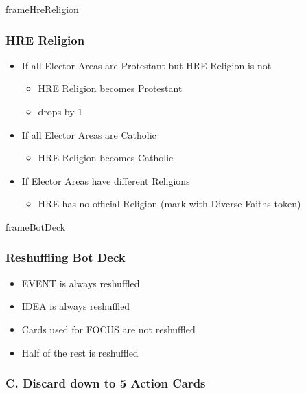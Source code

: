 \documentclass[10pt]{article}
\newlength{\fhHreReligion} \setlength\fhHreReligion{10\baselineskip}
\newlength{\fhBotDeck} \setlength\fhBotDeck{5\baselineskip}
\begin{document}
\begin{dynamiccontents*}{frameHreReligion}\begin{eubox}{\fhHreReligion}
	\subsubsection*{HRE Religion }
	\begin{itemize}
		\item If all Elector Areas are Protestant but HRE Religion is not
		\begin{itemize}
			\item HRE Religion becomes Protestant
			\item \authority drops by 1
		\end{itemize}
		\item If all Elector Areas are Catholic
		\begin{itemize}
			\item HRE Religion becomes Catholic
		\end{itemize}
		\item If Elector Areas have different Religions
		\begin{itemize}
			\item HRE has no official Religion (mark with Diverse Faiths token)
		\end{itemize}
	\end{itemize}
\end{eubox}\end{dynamiccontents*}
\begin{dynamiccontents*}{frameBotDeck}\begin{eubox}[botrulescolor]{\fhBotDeck}
	\botrules
	\subsubsection*{Reshuffling Bot Deck }
	\begin{itemize}
		\item EVENT is always reshuffled
		\item IDEA is always reshuffled
		\item Cards used for FOCUS are not reshuffled
		\item Half of the rest is reshuffled
	\end{itemize}
\end{eubox}\end{dynamiccontents*}

\subsubsection*{C. Discard down to 5 Action Cards}
\end{document}
